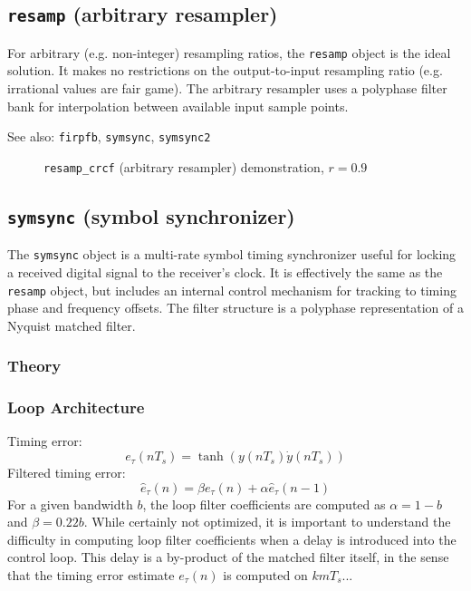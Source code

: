 \subsection{{\tt resamp} (arbitrary resampler)}
For arbitrary (e.g. non-integer) resampling ratios, the {\tt resamp} object is
the ideal solution.
It makes no restrictions on the output-to-input resampling ratio (e.g.
irrational values are fair game).
The arbitrary resampler uses a polyphase filter bank for interpolation between
available input sample points.

See also: {\tt firpfb}, {\tt symsync}, {\tt symsync2}

\begin{figure}
\centering
{}
\caption{{\tt resamp\_crcf} (arbitrary resampler) demonstration, $r=0.9$}
\label{fig:module:filter:resamp_crcf}
\end{figure}

\subsection{{\tt symsync} (symbol synchronizer)}
The {\tt symsync} object is a multi-rate symbol timing synchronizer useful for
locking a received digital signal to the receiver's clock.
It is effectively the same as the {\tt resamp} object, but includes an
internal control mechanism for tracking to timing phase and frequency offsets.
The filter structure is a polyphase representation of a Nyquist matched
filter.

\subsubsection{Theory}

\subsubsection{Loop Architecture}
Timing error:
\[
    e_\tau(nT_s) = \tanh\left( y(nT_s)\dot{y}(nT_s) \right)
\]
Filtered timing error:
\[
    \hat{e}_\tau(n) = \beta e_\tau(n) + \alpha \hat{e}_\tau(n-1)
\]
For a given bandwidth $b$, the loop filter coefficients are computed as
$\alpha = 1-b$ and $\beta = 0.22b$.
While certainly not optimized, it is important to understand the difficulty in
computing loop filter coefficients when a delay is introduced into the control
loop.
This delay is a by-product of the matched filter itself, in the sense that the
timing error estimate $e_\tau(n)$ is computed on $k m T_s$...

